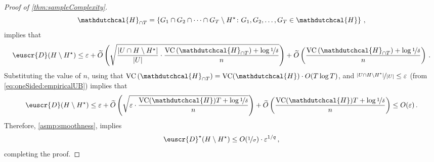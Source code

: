 \documentclass[11pt]{article}
\theoremstyle{plain}
\theoremstyle{definition}
\theoremstyle{remark}
\def\abs#1{\left| #1 \right|}
\newcommand{\inbrace}[1]{\left\{#1\right\}}
\newcommand{\inparen}[1]{\left(#1\right)}
\newcommand{\nfrac}[2]{\nicefrac{#1}{#2}}
\newcommand{\vc}{\textrm{\rm VC}}
\newcommand{\eps}{\varepsilon}
\newcommand{\wt}[1]{\widetilde{#1}}
\newcommand{\customcal}[1]{\euscr{#1}}
\newcommand{\cD}{\customcal{D}}
\newcommand{\hypo}[1]{\mathdutchcal{#1}}
\newcommand{\hyH}{\hypo{H}}
\newcommand{\optset}{{H^\star}}
\newcommand{\cDtrue}{\cD^\star}
\begin{document}
\begin{proof}[Proof of \cref{thm:sampleComplexity}]
                    \[
                        \hyH_{\cap T} = \inbrace{G_1\cap G_2\cap \dots\cap G_{T}\setminus\optset\colon G_1,G_2,\dots,G_{T} \in \hyH}\,,
                    \]
                    implies that 
                    \[
                        \cD(H\setminus \optset) \leq \eps + \wt{O}\inparen{\sqrt{
                            \frac{\abs{U\cap H\setminus \optset}}{\abs{U}}\cdot 
                            \frac{\vc{}\inparen{\hyH_{\cap T}}+\log{\nfrac{1}{\delta}}}{n}}}
                        + \wt{O}\inparen{{\frac{\vc{}\inparen{\hyH_{\cap T}}+\log{\nfrac{1}{\delta}}}{n}}}\,.
                    \]
                    Substituting the value of $n$, using that $\vc{}\inparen{\hyH_{\cap T}}=\vc{{(\hyH)}}\cdot O(T\log{T})$, and $\nfrac{\abs{U\cap H\setminus\optset}}{\abs{U}}\leq \eps$ (from \cref{eq:oneSided:empiricalUB}) implies that 
                    \[
                        \cD(H\setminus \optset) \leq \eps + \wt{O}\inparen{\sqrt{
                            \eps\cdot \frac{\vc{}(\hyH) T +\log{\nfrac{1}{\delta}}}{n}}
                        }
                        + \wt{O}\inparen{
                            \frac{\vc{}(\hyH) T+\log{\nfrac{1}{\delta}}}{n}
                        }
                        \leq O(\eps)
                        \,.
                    \]
                    Therefore, \cref{asmp:smoothness}, implies 
                    \[
                        \cDtrue(H\setminus \optset)
                        \leq O(\nfrac{1}{\sigma})\cdot \eps^{1/q}\,,
                    \]
                    completing the proof.

    \end{proof}
    
\end{document}
